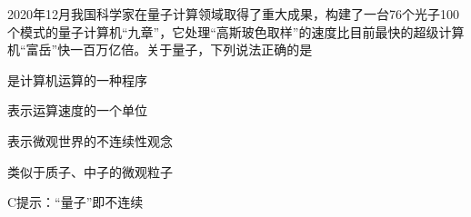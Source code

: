 2020年12月我国科学家在量子计算领域取得了重大成果，构建了一台76个光子100个模式的量子计算机“九章”，它处理“高斯玻色取样”的速度比目前最快的超级计算机“富岳”快一百万亿倍。关于量子，下列说法正确的是\paren[C]

\begin{choices}
	\item 是计算机运算的一种程序
	\item 表示运算速度的一个单位
	\item 表示微观世界的不连续性观念
	\item 类似于质子、中子的微观粒子
\end{choices}
\begin{answer}
    C\qquad 提示：“量子”即不连续
\end{answer}